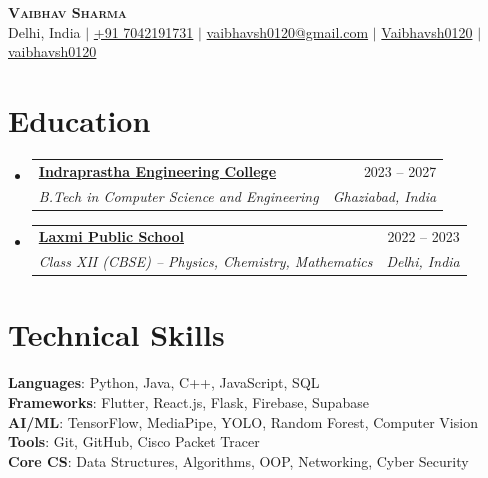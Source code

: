\documentclass[letterpaper,11pt]{article}
\makeatletter
\newcommand{\resumeSubheading}[4]{
  \vspace{-1pt}\item
  \begin{tabular*}{0.97\textwidth}{l@{\extracolsep{\fill}}r}
    \textbf{#1} & #2 \\
    \textit{\small #3} & \textit{\small #4}
  \end{tabular*}\vspace{-5pt}
}
\newcommand{\resumeSubHeadingListStart}{
\begin{itemize}[leftmargin=0.15in,label={},itemsep=2pt,topsep=2pt]
}
\newcommand{\resumeSubHeadingListEnd}{\end{itemize}\vspace{-2pt}}
\makeatother
\begin{document}
\begin{center}
    {\Huge \scshape \textbf{Vaibhav Sharma}} \\ \vspace{5pt}
    \small 
    \faMapMarker* \hspace{1pt} Delhi, India \hspace{3pt} $|$ \hspace{3pt}
    \faPhone \hspace{1pt} \href{tel:+917042191731}{+91 7042191731} \hspace{3pt} $|$ \hspace{3pt}
    \faEnvelope \hspace{1pt} \href{mailto:vaibhavsh0120@gmail.com}{vaibhavsh0120@gmail.com} \hspace{3pt} $|$ \hspace{3pt}
    \faGithub \hspace{1pt} \href{https://github.com/Vaibhavsh0120}{Vaibhavsh0120} \hspace{3pt} $|$ \hspace{3pt}
    \faLinkedin \hspace{1pt} \href{https://linkedin.com/in/vaibhavsh0120}{vaibhavsh0120}
\end{center}

\section{Education}
\resumeSubHeadingListStart
  \resumeSubheading
    {\href{https://www.ipec.org.in/}{Indraprastha Engineering College}}{2023 -- 2027}
    {B.Tech in Computer Science and Engineering}{Ghaziabad, India}
  \resumeSubheading
    {\href{https://www.laxmipublicschool.edu.in/}{Laxmi Public School}}{2022 -- 2023}
    {Class XII (CBSE) -- Physics, Chemistry, Mathematics}{Delhi, India}
\resumeSubHeadingListEnd

\section{Technical Skills}
\begin{itemize}[leftmargin=0.15in,label={},itemsep=1pt]
  \small{\item{
    \textbf{Languages}{: Python, Java, C++, JavaScript, SQL} \\
    \textbf{Frameworks}{: Flutter, React.js, Flask, Firebase, Supabase} \\
    \textbf{AI/ML}{: TensorFlow, MediaPipe, YOLO, Random Forest, Computer Vision} \\
    \textbf{Tools}{: Git, GitHub, Cisco Packet Tracer} \\
    \textbf{Core CS}{: Data Structures, Algorithms, OOP, Networking, Cyber Security}
  }}
\end{itemize}\vspace{-5pt}
\end{document}
